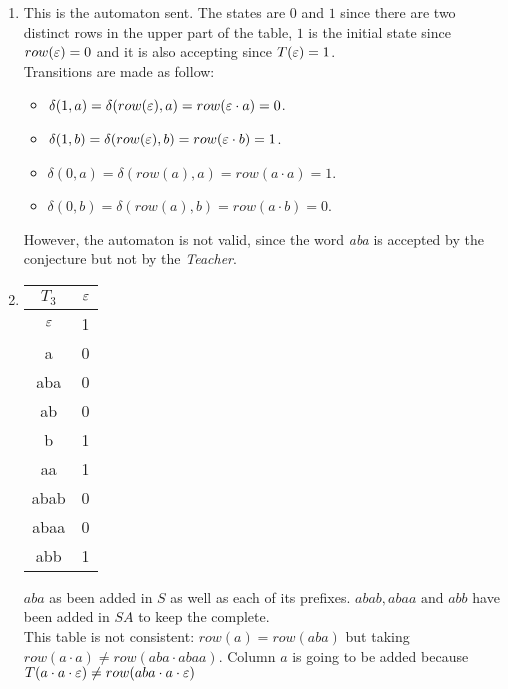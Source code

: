 \begin{enumerate}
  \item \begin{minipage}{0.3\textwidth}
          
        \end{minipage}\quad
        \begin{minipage}{0.6\textwidth}
          This is the automaton sent.
          The states are $0$ and $1$ since there are two distinct rows in the upper part of the table, $1$ is the initial state since $row(\varepsilon) = 0$ and it is also accepting since $T(\varepsilon) = 1$.\\
          Transitions are made as follow: \\
          \begin{itemize}
            \item $\delta(1, a) = \delta(row(\varepsilon), a) = row(\varepsilon \cdot a) = 0$.
            \item $\delta(1, b) = \delta(row(\varepsilon), b) = row(\varepsilon \cdot b) =  1$.
            \item $\delta(0, a) = \delta(row(a), a) = row(a \cdot a) =  1$.
            \item $\delta(0, b) = \delta(row(a), b) = row(a \cdot b) = 0$.
          \end{itemize}
          However, the automaton is not valid, since the word \textit{aba} is accepted by the conjecture but not by the \textit{Teacher}.
        \end{minipage}

  \item \begin{minipage}{0.3\textwidth}
          \begin{tabular}{c||c}
            $T_3$ & $\varepsilon$ \\
            \hline\hline
            $\varepsilon$  & 1    \\
            a     & 0    \\
            aba   & 0    \\
            ab    & 0    \\
            \hline\hline
            b     & 1    \\
            aa    & 1    \\
            abab  & 0    \\
            abaa  & 0    \\
            abb   & 1    \\
          \end{tabular}
        \end{minipage} \quad
        \begin{minipage}{0.5\textwidth}
          $aba$ as been added in $S$ as well as each of its prefixes. $abab, abaa \text{ and } abb$ have been added in $SA$ to keep the \OT complete. \\
          This table is not consistent: $row(a) = row(aba)$ but taking $row(a \cdot a) \neq row(aba \cdot abaa)$. Column $a$ is going to be added because $T(a \cdot a \cdot \varepsilon) \neq row(aba \cdot a \cdot \varepsilon)$
        \end{minipage}


\end{enumerate}
